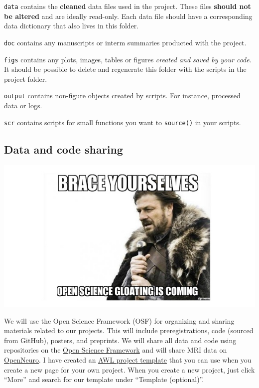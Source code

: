 \documentclass[
]{book}
\begin{document}
\texttt{data} contains the \textbf{cleaned} data files used in the project. These files \textbf{should not be altered} and are ideally read-only. Each data file should have a corresponding data dictionary that also lives in this folder.

\texttt{doc} contains any manuscripts or interm summaries producted with the project.

\texttt{figs} contains any plots, images, tables or figures \emph{created and saved by your code}. It should be possible to delete and regenerate this folder with the scripts in the project folder.

\texttt{output} contains non-figure objects created by scripts. For instance, processed data or logs.

\texttt{scr} contains scripts for small functions you want to \texttt{source()} in your scripts.

\hypertarget{data-and-code-sharing}{%
\subsection{Data and code sharing}\label{data-and-code-sharing}}

\includegraphics{images/open_science.jpg}

We will use the Open Science Framework (OSF) for organizing and sharing materials related to our projects. This will include preregistrations, code (sourced from GitHub), posters, and preprints. We will share all data and code using repositories on the \href{https://osf.io/}{Open Science Framework} and will share MRI data on \href{https://openneuro.org/}{OpenNeuro}. I have created an \href{https://osf.io/ce8p4/}{AWL project template} that you can use when you create a new page for your own project. When you create a new project, just click ``More'' and search for our template under ``Template (optional)''.
\end{document}
